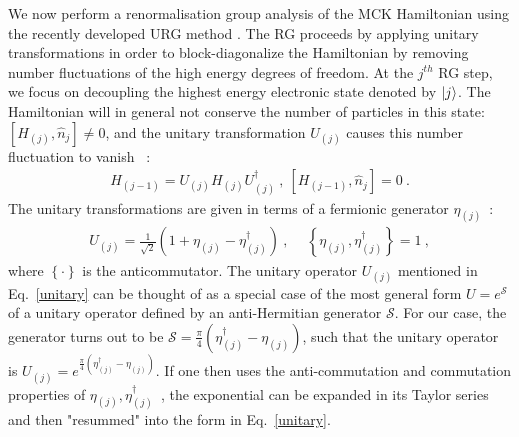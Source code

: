 \documentclass[reprint,prb,superscriptaddress]{revtex4-2}
\begin{document}
We now perform a renormalisation group analysis of the MCK Hamiltonian using the recently developed URG method \cite{anirbanmott1,anirbanmott2,anirbanurg1,anirbanurg2,siddharthacpi,santanukagome,1dhubjhep}.
The RG proceeds {by applying unitary transformations in order to block-diagonalize the Hamiltonian by removing number fluctuations of the high energy degrees of freedom}.
At the $j^{th}$ RG step, we focus on decoupling the highest energy electronic state denoted by $\ket{j}$.
The Hamiltonian will in general not conserve the number of particles in this state: \(\left[H_{(j)}, \hat n_{j}\right] \neq 0\), and the unitary transformation \(U_{(j)}\) causes this number fluctuation to vanish
~\cite{anirbanurg1,anirbanurg2}:
\begin{equation}\begin{aligned}
	H_{(j-1)} = U_{(j)} H_{(j)} U^\dagger_{(j)}~, ~\left[H_{(j-1)}, \hat n_{j}\right] =0~.
\end{aligned}\end{equation}
The unitary transformations are given in terms of a fermionic generator \(\eta_{(j)}\)~\cite{anirbanurg1,anirbanurg2}:
\begin{equation}\begin{aligned}
	\label{unitary}
	U_{(j)} = \frac{1}{\sqrt 2}\left(1 + \eta_{(j)} - \eta_{(j)}^\dagger\right)~,~ \quad\left\{ \eta_{(j)},\eta_{(j)}^\dagger \right\} = 1~,
\end{aligned}\end{equation}
where \(\left\{\cdot\right\}\) is the anticommutator. {\color{blue}The unitary operator \(U_{(j)}\) mentioned in Eq.~\eqref{unitary} can be thought of as a special case of the most general form \(U = e^\mathcal{S}\) of a unitary operator defined by an anti-Hermitian generator \(\mathcal{S}\). For our case, the generator turns out to be \(\mathcal{S} = \frac{\pi}{4}\left( \eta^\dagger_{(j)} - \eta_{(j)} \right) \), such that the unitary operator is \(U_{(j)} = e^{\frac{\pi}{4}\left(\eta^\dagger_{(j)} - \eta_{(j)}\right) }\). If one then uses the anti-commutation and commutation properties of \(\eta_{(j)},\eta^\dagger_{(j)}\)~\cite{anirbanurg1,anirbanurg2}, the exponential can be expanded in its Taylor series and then "resummed" into the form in Eq.~\eqref{unitary}.}
\end{document}
